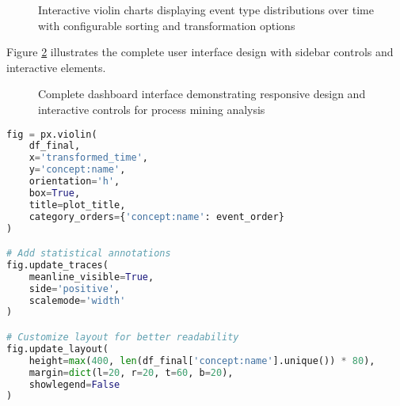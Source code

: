 \documentclass[11pt,a4paper]{article}
\begin{document}

\begin{figure}[H]
\centering
\begin{center}
\end{center}
\caption{Interactive violin charts displaying event type distributions over time with configurable sorting and transformation options}
\label{fig:violin_example}
\end{figure}

Figure \ref{fig:system_ui} illustrates the complete user interface design with sidebar controls and interactive elements.


\begin{figure}[H]
\centering
\begin{center}
\end{center}
\caption{Complete dashboard interface demonstrating responsive design and interactive controls for process mining analysis}
\label{fig:system_ui}
\end{figure}

\begin{lstlisting}[language=Python, caption=Violin Chart Generation]
fig = px.violin(
    df_final, 
    x='transformed_time', 
    y='concept:name',
    orientation='h',
    box=True,
    title=plot_title,
    category_orders={'concept:name': event_order}
)

# Add statistical annotations
fig.update_traces(
    meanline_visible=True,
    side='positive',
    scalemode='width'
)

# Customize layout for better readability
fig.update_layout(
    height=max(400, len(df_final['concept:name'].unique()) * 80),
    margin=dict(l=20, r=20, t=60, b=20),
    showlegend=False
)
\end{lstlisting}
\end{document}
